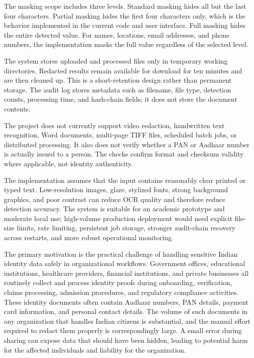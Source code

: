 The masking scope includes three levels. Standard masking hides all but the last four characters. Partial masking hides the first four characters only, which is the behavior implemented in the current code and user interface. Full masking hides the entire detected value. For names, locations, email addresses, and phone numbers, the implementation masks the full value regardless of the selected level.

The system stores uploaded and processed files only in temporary working directories. Redacted results remain available for download for ten minutes and are then cleaned up. This is a short-retention design rather than permanent storage. The audit log stores metadata such as filename, file type, detection counts, processing time, and hash-chain fields; it does not store the document contents.

The project does not currently support video redaction, handwritten text recognition, Word documents, multi-page TIFF files, scheduled batch jobs, or distributed processing. It also does not verify whether a PAN or Aadhaar number is actually issued to a person. The checks confirm format and checksum validity where applicable, not identity authenticity.

The implementation assumes that the input contains reasonably clear printed or typed text. Low-resolution images, glare, stylized fonts, strong background graphics, and poor contrast can reduce OCR quality and therefore reduce detection accuracy. The system is suitable for an academic prototype and moderate local use; high-volume production deployment would need explicit file-size limits, rate limiting, persistent job storage, stronger audit-chain recovery across restarts, and more robust operational monitoring.

\bigskip

The primary motivation is the practical challenge of handling sensitive Indian identity data safely in organizational workflows. Government offices, educational institutions, healthcare providers, financial institutions, and private businesses all routinely collect and process identity proofs during onboarding, verification, claims processing, admission procedures, and regulatory compliance activities. These identity documents often contain Aadhaar numbers, PAN details, payment card information, and personal contact details. The volume of such documents in any organization that handles Indian citizens is substantial, and the manual effort required to redact them properly is correspondingly large. A small error during sharing can expose data that should have been hidden, leading to potential harm for the affected individuals and liability for the organization.

